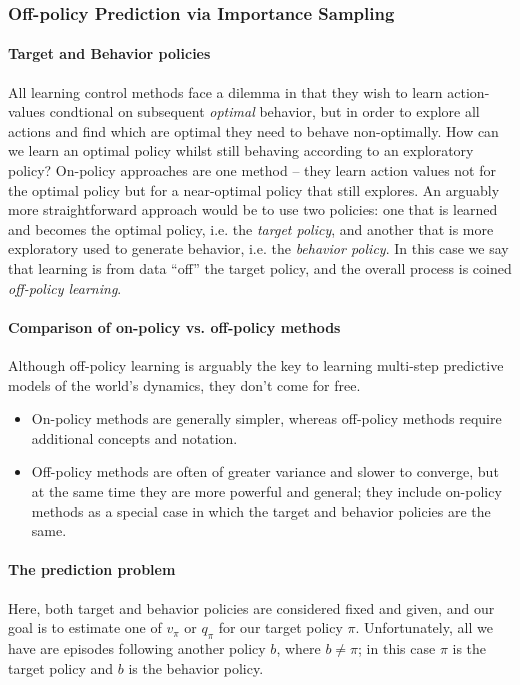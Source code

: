 \documentclass[12pt]{article}
\begin{document}
\subsubsection{Off-policy Prediction via Importance Sampling}
\paragraph{Target and Behavior policies} All learning control methods face a dilemma in that they wish to learn action-values condtional on subsequent \emph{optimal} behavior, but in order to explore all actions and find which are optimal they need to behave non-optimally. How can we learn an optimal policy whilst still behaving according to an exploratory policy? On-policy approaches are one method -- they learn action values not for the optimal policy but for a near-optimal policy that still explores. An arguably more straightforward approach would be to use two policies: one that is learned and becomes the optimal policy, i.e. the \emph{target policy}, and another that is more exploratory used to generate behavior, i.e. the \emph{behavior policy}. In this case we say that learning is from data ``off'' the target policy, and the overall process is coined \emph{off-policy learning}.

\paragraph{Comparison of on-policy vs. off-policy methods}
Although off-policy learning is arguably the key to learning multi-step predictive models of the world's dynamics, they don't come for free.
\begin{itemize}
  \item On-policy methods are generally simpler, whereas off-policy methods     require additional concepts and notation.
\item Off-policy methods are often of greater variance and slower to converge, but at the same time they are more powerful and general; they include on-policy methods as a special case in which the target and behavior policies are the same.
\end{itemize}

\paragraph{The prediction problem} Here, both target and behavior policies are considered fixed and given, and our goal is to estimate one of $v_\pi$ or $q_\pi$ for our target policy $\pi$. Unfortunately, all we have are episodes following another policy $b$, where $b \neq \pi$; in this case $\pi$ is the target policy and $b$ is the behavior policy.
\end{document}
